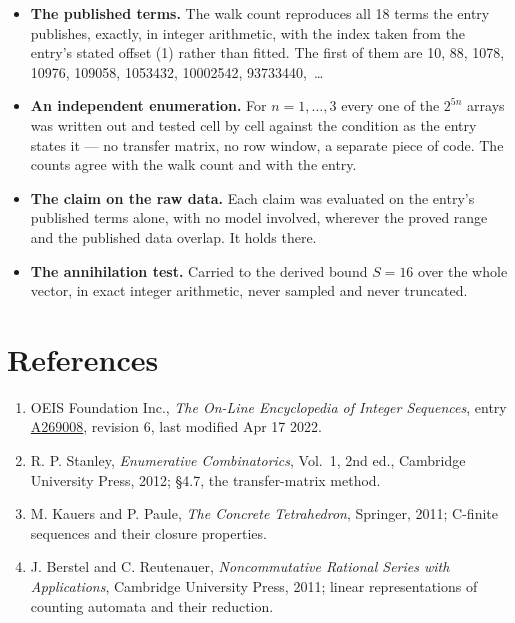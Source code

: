 \documentclass[11pt]{article}
\theoremstyle{definition}
\begin{document}
\begin{itemize}

\item {\bfseries The published terms.} The walk count reproduces all 18 terms the entry publishes, exactly, in integer arithmetic, with the index taken from the entry's stated offset (1) rather than fitted. The first of them are 10, 88, 1078, 10976, 109058, 1053432, 10002542, 93733440,~\dots

\item {\bfseries An independent enumeration.} For $n = 1,\dots,3$ every one of the $2^{5n}$ arrays was written out and tested cell by cell against the condition as the entry states it --- no transfer matrix, no row window, a separate piece of code. The counts agree with the walk count and with the entry.

\item {\bfseries The claim on the raw data.} Each claim was evaluated on the entry's published terms alone, with no model involved, wherever the proved range and the published data overlap. It holds there.

\item {\bfseries The annihilation test.} Carried to the derived bound $S = 16$ over the whole vector, in exact integer arithmetic, never sampled and never truncated.

\end{itemize}

\section{References}

\begin{enumerate}

\item OEIS Foundation Inc., \emph{The On-Line Encyclopedia of Integer Sequences}, entry \href{https://oeis.org/A269008}{A269008}, revision 6, last modified Apr 17 2022.

\item R. P. Stanley, \emph{Enumerative Combinatorics}, Vol.~1, 2nd ed., Cambridge University Press, 2012; \S4.7, the transfer-matrix method.

\item M. Kauers and P. Paule, \emph{The Concrete Tetrahedron}, Springer, 2011; C-finite sequences and their closure properties.

\item J. Berstel and C. Reutenauer, \emph{Noncommutative Rational Series with Applications}, Cambridge University Press, 2011; linear representations of counting automata and their reduction.

\end{enumerate}
\end{document}
